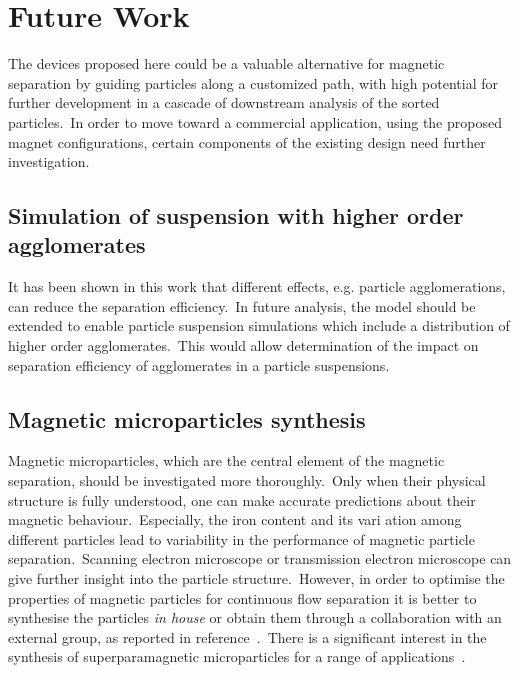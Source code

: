 \section{Future Work}\label{sec:futureWork}
The devices proposed here could be a valuable alternative for magnetic separation by guiding particles along a customized path, with high potential for further development in a cascade of downstream analysis of the sorted particles.\ In order to move toward a commercial application, using the proposed magnet configurations, certain components of the existing design need further investigation.\ 
%
\subsection{Simulation of suspension with higher order agglomerates}
It has been shown in this work that different effects, e.g. particle agglomerations, can reduce the separation efficiency.\ In future analysis, the model should be extended to enable particle suspension simulations which include a distribution of higher order agglomerates.\ This would allow determination of the impact on separation efficiency of agglomerates in a particle suspensions.\
%
\subsection{Magnetic microparticles synthesis}
Magnetic microparticles, which are the central element of the magnetic separation, should be investigated more thoroughly.\ Only when their physical structure is fully understood, one can make accurate predictions about their magnetic behaviour.\ Especially, the iron content and its vari ation among different particles lead to variability in the performance of magnetic particle separation.\ Scanning electron microscope or transmission electron microscope can give further insight into the particle structure.\ However, in order to optimise the properties of magnetic particles for continuous flow separation it is better to synthesise the particles \textit{in house} or obtain them through a collaboration with an external group, as reported in reference~\cite{Zborowski2002}.\ There is a significant interest in the synthesis of superparamagnetic microparticles for a range of applications~\cite{Ma2003,Liu2003,Liu2004}.\
%

